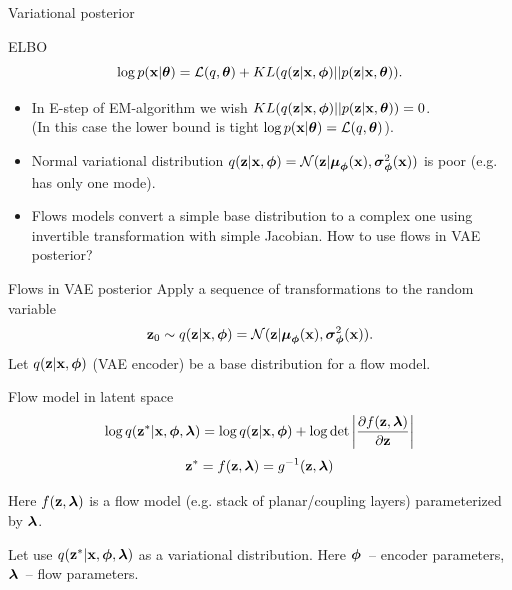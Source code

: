 \begin{frame}{Variational posterior}
	\begin{block}{ELBO}
		\[
		\log p(\mathbf{x} | \boldsymbol{\theta}) = \mathcal{L}(q, \boldsymbol{\theta}) + KL(q(\mathbf{z} | \mathbf{x}, \boldsymbol{\phi}) || p(\mathbf{z} | \mathbf{x}, \boldsymbol{\theta})).
		\]
	\end{block}
	\begin{itemize}
		\item In E-step of EM-algorithm we wish $KL(q(\mathbf{z} | \mathbf{x}, \boldsymbol{\phi}) || p(\mathbf{z} | \mathbf{x}, \boldsymbol{\theta})) = 0$. \\
		(In this case the lower bound is tight $\log p(\mathbf{x} | \boldsymbol{\theta}) = \mathcal{L}(q, \boldsymbol{\theta})$). \\
		\item Normal variational distribution $q(\mathbf{z} | \mathbf{x}, \boldsymbol{\phi}) = \mathcal{N}(\mathbf{z}| \boldsymbol{\mu}_{\boldsymbol{\phi}}(\mathbf{x}), \boldsymbol{\sigma}^2_{\boldsymbol{\phi}}(\mathbf{x}))$ is poor (e.g. has only one mode). \\
		\item Flows models convert a simple base distribution to a complex one using invertible transformation with simple Jacobian. How to use flows in VAE posterior?
	\end{itemize}
\end{frame}
\begin{frame}{Flows in VAE posterior}
	Apply a sequence of transformations to the random variable
	\[
	\mathbf{z}_0 \sim q(\mathbf{z} | \mathbf{x}, \boldsymbol{\phi}) = \mathcal{N}(\mathbf{z}| \boldsymbol{\mu}_{\boldsymbol{\phi}}(\mathbf{x}), \boldsymbol{\sigma}^2_{\boldsymbol{\phi}}(\mathbf{x})).
	\]
	Let $q(\mathbf{z} | \mathbf{x}, \boldsymbol{\phi})$ (VAE encoder) be a base distribution for a flow model.
	
	\begin{block}{Flow model in latent space}
		\vspace{-0.3cm}
		\[
			\log q(\mathbf{z}^* | \mathbf{x}, \boldsymbol{\phi}, \boldsymbol{\lambda}) = \log q(\mathbf{z} | \mathbf{x}, \boldsymbol{\phi}) + \log \det \left | \frac{\partial f(\mathbf{z}, \boldsymbol{\lambda})}{\partial \mathbf{z}}\right|
		\]
		\[
			\mathbf{z}^* = f(\mathbf{z}, \boldsymbol{\lambda}) = g^{-1}(\mathbf{z}, \boldsymbol{\lambda})
		\]
	\end{block}
	Here $f(\mathbf{z}, \boldsymbol{\lambda})$ is a flow model (e.g. stack of planar/coupling layers) parameterized by $\boldsymbol{\lambda}$.
	
	
	Let use $q(\mathbf{z}^* | \mathbf{x}, \boldsymbol{\phi}, \boldsymbol{\lambda})$ as a variational distribution. Here $\boldsymbol{\phi}$~-- encoder parameters, $\boldsymbol{\lambda}$~-- flow parameters.
	
\end{frame}
